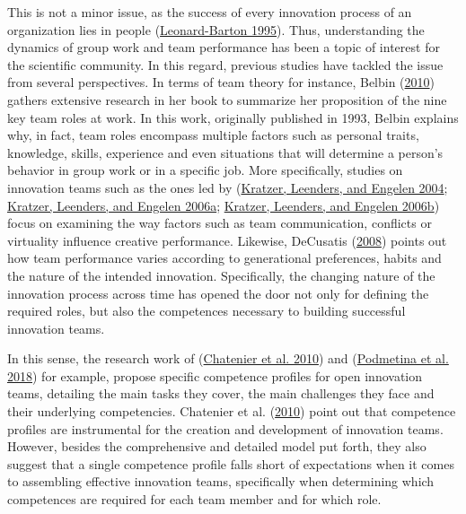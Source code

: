 \documentclass[AMA,STIX1COL,APA,STIX2COL]{WileyNJD-v2}
\begin{document}
This is not a minor issue, as the success of every innovation process of
an organization lies in people
(\protect\hyperlink{ref-Leonard1995}{Leonard-Barton 1995}). Thus,
understanding the dynamics of group work and team performance has been a
topic of interest for the scientific community. In this regard, previous
studies have tackled the issue from several perspectives. In terms of
team theory for instance, Belbin
(\protect\hyperlink{ref-Belbin2010}{2010}) gathers extensive research in
her book to summarize her proposition of the nine key team roles at
work. In this work, originally published in 1993, Belbin explains why,
in fact, team roles encompass multiple factors such as personal traits,
knowledge, skills, experience and even situations that will determine a
person's behavior in group work or in a specific job. More specifically,
studies on innovation teams such as the ones led by
(\protect\hyperlink{ref-Kratzer2004}{Kratzer, Leenders, and Engelen
2004}; \protect\hyperlink{ref-Kratzer2006-A}{Kratzer, Leenders, and
Engelen 2006a}; \protect\hyperlink{ref-Kratzer2006-B}{Kratzer, Leenders,
and Engelen 2006b}) focus on examining the way factors such as team
communication, conflicts or virtuality influence creative performance.
Likewise, DeCusatis (\protect\hyperlink{ref-DeCusatis2008}{2008}) points
out how team performance varies according to generational preferences,
habits and the nature of the intended innovation. Specifically, the
changing nature of the innovation process across time has opened the
door not only for defining the required roles, but also the competences
necessary to building successful innovation teams.

In this sense, the research work of
(\protect\hyperlink{ref-Chatenier2010}{Chatenier et al. 2010}) and
(\protect\hyperlink{ref-Podmetina2018}{Podmetina et al. 2018}) for
example, propose specific competence profiles for open innovation teams,
detailing the main tasks they cover, the main challenges they face and
their underlying competencies. Chatenier et al.
(\protect\hyperlink{ref-Chatenier2010}{2010}) point out that competence
profiles are instrumental for the creation and development of innovation
teams. However, besides the comprehensive and detailed model put forth,
they also suggest that a single competence profile falls short of
expectations when it comes to assembling effective innovation teams,
specifically when determining which competences are required for each
team member and for which role.
\end{document}
